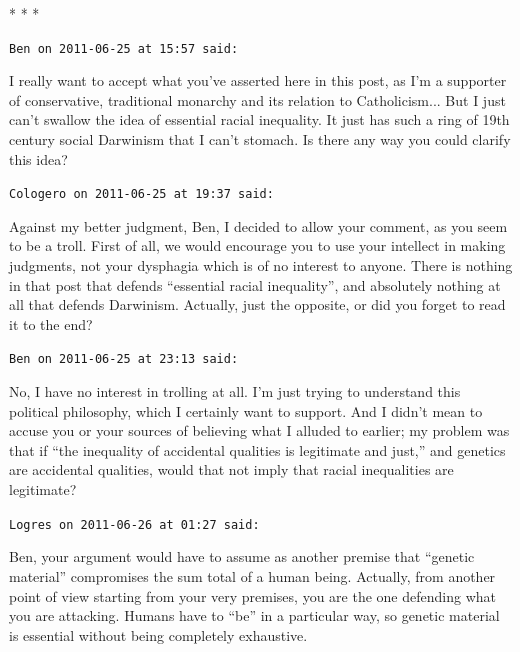 
\begin{center}* * *\end{center}

\begin{footnotesize}
\begin{sffamily}
\texttt{Ben on 2011-06-25 at 15:57 said:}

I really want to accept what you've asserted here in this post, as I'm a supporter of conservative, traditional monarchy and its relation to Catholicism... But I just can't swallow the idea of essential racial inequality. It just has such a ring of 19th century social Darwinism that I can't stomach. Is there any way you could clarify this idea?

\hfill

\texttt{Cologero on 2011-06-25 at 19:37 said:}

Against my better judgment, Ben, I decided to allow your comment, as you seem to be a troll. First of all, we would encourage you to use your intellect in making judgments, not your dysphagia which is of no interest to anyone. There is nothing in that post that defends ``essential racial inequality'', and absolutely nothing at all that defends Darwinism. Actually, just the opposite, or did you forget to read it to the end?

\hfill

\texttt{Ben on 2011-06-25 at 23:13 said:}

No, I have no interest in trolling at all. I'm just trying to understand this political philosophy, which I certainly want to support. And I didn't mean to accuse you or your sources of believing what I alluded to earlier; my problem was that if ``the inequality of accidental qualities is legitimate and just,'' and genetics are accidental qualities, would that not imply that racial inequalities are legitimate?

\hfill

\texttt{Logres on 2011-06-26 at 01:27 said:}

Ben, your argument would have to assume as another premise that ``genetic material'' compromises the sum total of a human being. Actually, from another point of view starting from your very premises, you are the one defending what you are attacking. Humans have to ``be'' in a particular way, so genetic material is essential without being completely exhaustive.

\hfill


\end{sffamily}
\end{footnotesize}
